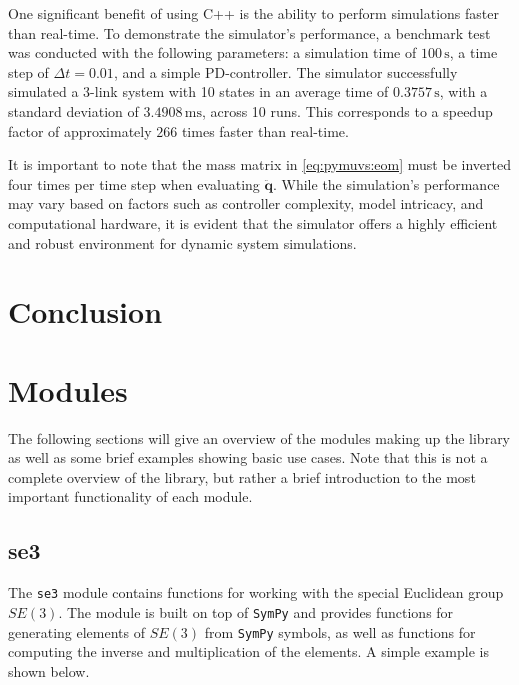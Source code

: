 One significant benefit of using C++ is the ability to perform simulations 
faster than real-time. To demonstrate the simulator's performance, a benchmark 
test was conducted with the following parameters: a simulation time of $100 \, 
\mathrm{s}$, a time step of $\Delta t = 0.01$, and a simple PD-controller. The 
simulator successfully simulated a 3-link system with 10 states in an average 
time of $0.3757 \, \mathrm{s}$, with a standard deviation of $3.4908 \, 
\mathrm{ms}$, across 10 runs. This corresponds to a speedup factor of 
approximately $266$ times faster than real-time.

It is important to note that the mass matrix in \autoref{eq:pymuvs:eom} must be 
inverted four times per time step when evaluating $\ddot{\bm{q}}$. While the 
simulation's performance may vary based on factors such as controller 
complexity, model intricacy, and computational hardware, it is evident that the 
simulator offers a highly efficient and robust environment for dynamic system 
simulations.

\section{Conclusion}

\iffalse

\section{Modules}
The following sections will give an overview of the modules making up the
library as well as some brief examples showing basic use cases. Note that this
is not a complete overview of the library, but rather a brief introduction to
the most important functionality of each module.

\subsection{se3}
The \texttt{se3} module contains functions for working with the special Euclidean
group $SE(3)$. The module is built on top of \texttt{SymPy} and provides functions for
generating elements of $SE(3)$ from \texttt{SymPy} symbols, as well as functions
for computing the inverse and multiplication of the elements. A simple example
is shown below.

